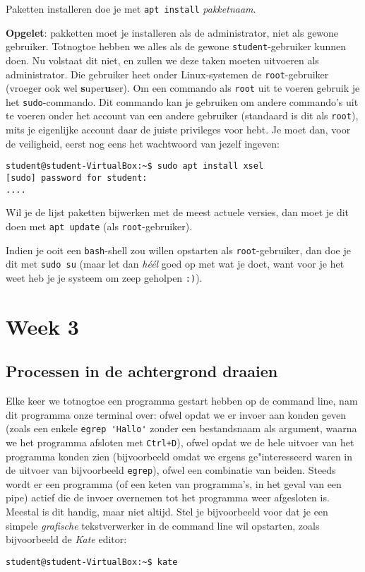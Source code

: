 \documentclass[a4paper,twoside,openany]{memoir}
\begin{document}
Paketten installeren doe je met \verb!apt install! \emph{pakketnaam}.

\textbf{Opgelet}: pakketten moet je installeren als de administrator, niet als
gewone gebruiker. Totnogtoe hebben we alles als de gewone
\verb!student!-gebruiker kunnen doen. Nu volstaat dit niet, en zullen we deze
taken moeten uitvoeren als administrator. Die gebruiker heet onder
Linux-systemen de \verb!root!-gebruiker (vroeger ook wel
\textbf{s}uper\textbf{u}ser). Om een commando als \verb!root! uit te voeren
gebruik je het \verb!sudo!-commando. Dit commando kan je gebruiken om andere
commando's uit te voeren onder het account van een andere gebruiker (standaard
is dit als \verb!root!), mits je eigenlijke account daar de juiste privileges
voor hebt. Je moet dan, voor de veiligheid, eerst nog eens het wachtwoord van
jezelf ingeven:

\begin{verbatim}
student@student-VirtualBox:~$ sudo apt install xsel
[sudo] password for student: 
....
\end{verbatim}

Wil je de lijst paketten bijwerken met de meest actuele versies, dan moet je dit
doen met \verb!apt update! (als \verb!root!-gebruiker).

Indien je ooit een \verb!bash!-shell zou willen opstarten als
\verb!root!-gebruiker, dan doe je dit met \verb!sudo su! (maar let dan
\emph{h\'e\'el} goed op met wat je doet, want voor je het weet heb je je systeem
om zeep geholpen \verb!:)!).

\part{Week 3}

\chapter{Processen in de achtergrond draaien}

Elke keer we totnogtoe een programma gestart hebben op de command line, nam dit
programma onze terminal over: ofwel opdat we er invoer aan konden geven (zoals
een enkele \verb!egrep 'Hallo'! zonder een bestandsnaam als argument, waarna we
het programma afsloten met \verb!Ctrl+D!), ofwel opdat we de hele uitvoer van
het programma konden zien (bijvoorbeeld omdat we ergens ge"interesseerd waren
in de uitvoer van bijvoorbeeld \verb!egrep!), ofwel een combinatie van beiden.
Steeds wordt er een programma (of een keten van programma's, in het geval van
een pipe) actief die de invoer overnemen tot het programma weer afgesloten is.
Meestal is dit handig, maar niet altijd. Stel je bijvoorbeeld voor dat je een
simpele \emph{grafische} tekstverwerker in de command line wil opstarten, zoals
bijvoorbeeld de \emph{Kate} editor:
\begin{verbatim}
student@student-VirtualBox:~$ kate
\end{verbatim}
\end{document}
